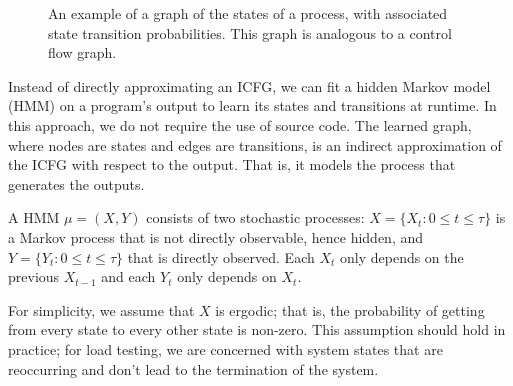 \begin{figure}
    \caption{An example of a graph of the states of a process, with associated state transition probabilities. This graph is analogous to a control flow graph.}
    \label{fig:state_graph}
    \vspace{2ex}
\end{figure}

Instead of directly approximating an ICFG, we can fit a hidden Markov model (HMM) on a program's output to learn its states and transitions at runtime. In this approach, we do not require the use of source code. The learned graph, where nodes are states and edges are transitions, is an indirect approximation of the ICFG with respect to the output. That is, it models the process that generates the outputs.

A HMM \(\mu = (X, Y)\) consists of two stochastic processes: \(X = \{X_t : 0 \leq t \leq \tau\}\) is a Markov process that is not directly observable, hence hidden, and \(Y = \{Y_t : 0 \leq t \leq \tau\}\) that is directly observed. Each \(X_t\) only depends on the previous \(X_{t-1}\) and each \(Y_t\) only depends on \(X_t\).

For simplicity, we assume that \(X\) is ergodic; that is, the probability of getting from every state to every other state is non-zero. This assumption should hold in practice; for load testing, we are concerned with system states that are reoccurring and don't lead to the termination of the system.

